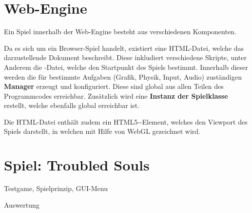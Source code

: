 \part{Web-Engine}

Ein Spiel innerhalb der Web-Engine besteht aus verschiedenen Komponenten.

Da es sich um ein Browser-Spiel handelt, existiert eine HTML-Datei, welche das darzustellende Dokument beschreibt. Diese inkludiert verschiedene Skripte, unter Anderem die -Datei, welche den Startpunkt des Spiels bestimmt. Innerhalb dieser werden die für bestimmte Aufgaben (Grafik, Physik, Input, Audio) zuständigen \textbf{Manager} erzeugt und konfiguriert. Diese sind global aus allen Teilen des Programmcodes erreichbar. Zusätzlich wird eine \textbf{Instanz der Spielklasse} erstellt, welche ebenfalls global erreichbar ist.

Die HTML-Datei enthält zudem ein HTML5--Element, welches den Viewport des Spiels darstellt, in welchen mit Hilfe von WebGL gezeichnet wird.













\part{Spiel: Troubled Souls}

Testgame, Spielprinzip, GUI-Menu

Auswertung
